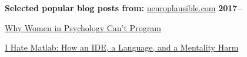 \documentclass[10pt]{article}
\newenvironment{outerlist}[1][\enskip\textbullet]%
        {\begin{itemize}[#1]}{\end{itemize}%
         \vspace{-.6\baselineskip}}
\newenvironment{innerlist}[1][\enskip\textbullet]%
        {\begin{compactitem}[#1]}{\end{compactitem}}
\begin{document}
 \begin{outerlist}

   
   
  
   \item[\textbf{Selected popular blog posts from:}] \href{http://neuroplausible.com}{neuroplausible.com} \hfill \textbf{2017--}
      \begin{innerlist}
        \item \href{https://neuroplausible.com/programming}{Why Women in Psychology Can't Program}
         \item \href{https://neuroplausible.com/matlab}{I Hate Matlab: How an IDE, a Language, and a Mentality Harm} 

   \end{innerlist}
   
 \end{outerlist}
\end{document}
